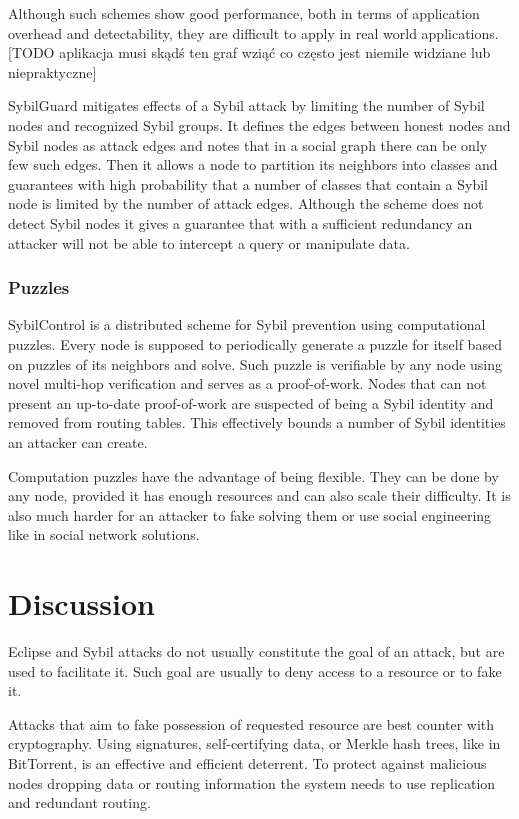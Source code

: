   Although such schemes show good performance, both in terms of application
  overhead and detectability, they are difficult to apply in real world
  applications.  [TODO aplikacja musi skądś ten graf wziąć co często jest
  niemile widziane lub niepraktyczne]

  SybilGuard \cite{hai06} mitigates effects of a Sybil attack by limiting the
  number of Sybil nodes and recognized Sybil groups. It defines the edges
  between honest nodes and Sybil nodes as attack edges and notes that in a
  social graph there can be only few such edges. Then it allows a node to
  partition its neighbors into classes and guarantees with high probability
  that a number of classes that contain a Sybil node is limited by the number of
  attack edges. Although the scheme does not detect Sybil nodes it gives a
  guarantee that with a sufficient redundancy an attacker will not be able to
  intercept a query or manipulate data.

  \subsubsection{Puzzles}
  SybilControl\cite{li12} is a distributed scheme for Sybil prevention using
  computational puzzles. Every node is supposed to periodically generate a
  puzzle for itself based on puzzles of its neighbors and solve. Such puzzle
  is verifiable by any node using novel multi-hop verification and serves as a
  proof-of-work. Nodes that can not present an up-to-date proof-of-work are
  suspected of being a Sybil identity and removed from routing tables. This
  effectively bounds a number of Sybil identities an attacker can create.

  Computation puzzles have the advantage of being flexible. They can be done by
  any node, provided it has enough resources and can also scale their
  difficulty. It is also much harder for an attacker to fake solving them or use
  social engineering like in social network solutions.

\section{Discussion}
  Eclipse and Sybil attacks do not usually constitute the goal of an attack, but
  are used to facilitate it. Such goal are usually to deny access to a resource
  or to fake it.

  Attacks that aim to fake possession of requested resource are best counter
  with cryptography. Using signatures, self-certifying data, or Merkle hash
  trees, like in BitTorrent, is an effective and efficient deterrent.
  To protect against malicious nodes dropping data or routing information the
  system needs to use replication and redundant routing. 

